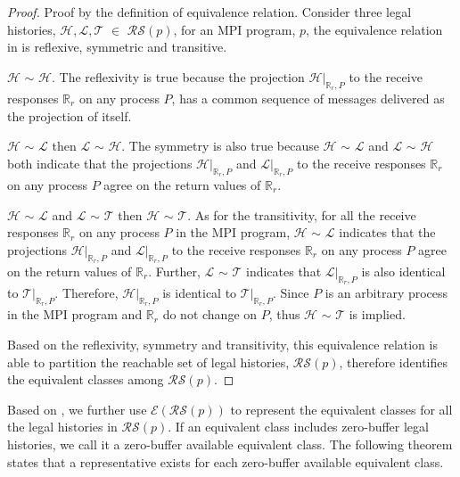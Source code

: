 \begin{proof}
Proof by the definition of equivalence relation. Consider three legal histories, $\mathcal{H}, \mathcal{L}, \mathcal{T}$ $\in$ $\mathcal{RS}(\mathit{p})$, for an MPI program, $\mathit{p}$, the equivalence relation in  is reflexive, symmetric and transitive.
\begin{compactenum}
\item $\mathcal{H}$ $\sim$ $\mathcal{H}$. The reflexivity is true because the projection $\mathcal{H} | _{\mathbb{R}_r,P}$ to the receive responses $\mathbb{R}_r$ on any process $P$, has a common sequence of messages delivered as the projection of itself.
\item $\mathcal{H}$ $\sim$ $\mathcal{L}$ then $\mathcal{L}$ $\sim$ $\mathcal{H}$. The symmetry is also true because $\mathcal{H}$ $\sim$ $\mathcal{L}$ and $\mathcal{L}$ $\sim$ $\mathcal{H}$ both indicate that the projections $\mathcal{H} | _{\mathbb{R}_r,P}$ and $\mathcal{L} | _{\mathbb{R}_r,P}$ to the receive responses $\mathbb{R}_r$ on any process $P$ agree on the return values of $\mathbb{R}_r$.
\item $\mathcal{H}$ $\sim$ $\mathcal{L}$ and $\mathcal{L}$ $\sim$ $\mathcal{T}$ then $\mathcal{H}$ $\sim$ $\mathcal{T}$. As for the transitivity, for all the receive responses $\mathbb{R}_r$ on any process $P$ in the MPI program, $\mathcal{H}$ $\sim$ $\mathcal{L}$ indicates that the projections $\mathcal{H} | _{\mathbb{R}_r,P}$ and $\mathcal{L} | _{\mathbb{R}_r,P}$ to the receive responses $\mathbb{R}_r$ on any process $P$ agree on the return values of $\mathbb{R}_r$. Further, $\mathcal{L}$ $\sim$ $\mathcal{T}$ indicates that $\mathcal{L} | _{\mathbb{R}_r,P}$ is also identical to $\mathcal{T} | _{\mathbb{R}_r,P}$. Therefore, $\mathcal{H} | _{\mathbb{R}_r,P}$ is identical to $\mathcal{T} | _{\mathbb{R}_r,P}$. Since $P$ is an arbitrary process in the MPI program and $\mathbb{R}_r$ do not change on $P$, thus $\mathcal{H}$ $\sim$ $\mathcal{T}$ is implied.
\end{compactenum}
Based on the reflexivity, symmetry and transitivity, this equivalence relation is able to partition the reachable set of legal histories, $\mathcal{RS}(\mathit{p})$, therefore identifies the equivalent classes among $\mathcal{RS}(\mathit{p})$.
\end{proof}

Based on , we further use $\mathcal{E}$$(\mathcal{RS}(\mathit{p}))$ to represent the equivalent classes for all the legal histories in $\mathcal{RS}(\mathit{p})$. If an equivalent class includes zero-buffer legal histories, we call it a zero-buffer available equivalent class. The following theorem states that a representative exists for each zero-buffer available equivalent class.


